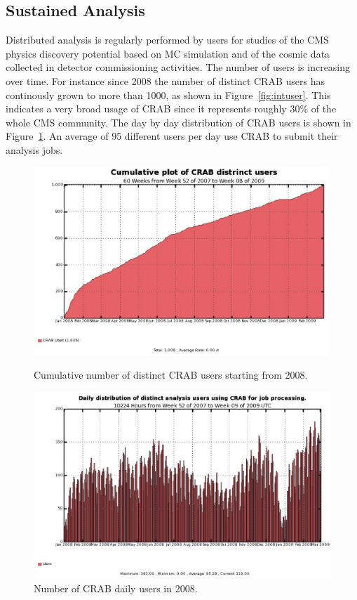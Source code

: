 \subsection{Sustained Analysis}
\label{sec:5_2}

Distributed analysis is regularly performed by users for studies of the CMS physics discovery potential based on MC simulation and of the cosmic data collected in detector commissioning activities.
The number of users is increasing over time. For instance since 2008 the number of distinct CRAB users has continously grown to more than 1000, as shown in Figure~\ref{fig:intuser}. This indicates a very broad usage of CRAB since it represents roughly 30\% of the whole CMS community.
The day by day distribution of CRAB users is shown in Figure~\ref{fig:distusers}. An average of 95 different users per day use CRAB to submit their analysis 
jobs. 

\begin{figure}
\begin{minipage}{.48\textwidth}
\centering
\includegraphics[width=0.99\textwidth]{UserInteg.eps}
\caption{Cumulative number of distinct CRAB users starting from 2008. }
\label{fig:intuser}
\end{minipage}
\begin{minipage}{.48\textwidth}
\centering
\includegraphics[width=1.2\textwidth]{crabusersdaily.eps}
\caption{Number of CRAB daily users in 2008. }
\label{fig:distusers}
\end{minipage}
\end{figure}


